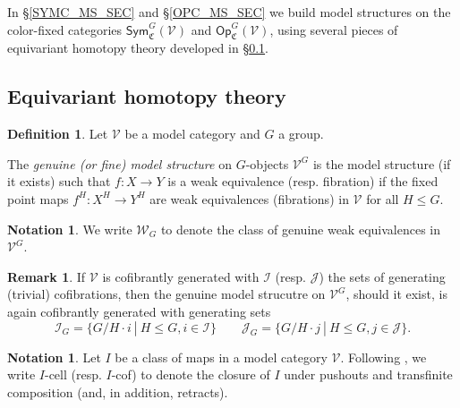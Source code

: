\documentclass[a4paper,10pt
,draft
]{article}%
\numberwithin{equation}{section}
\numberwithin{figure}{section}
\theoremstyle{definition} %
\newtheorem{definition}[equation]{Definition}%
\newtheorem{remark}[equation]{Remark}%
\newtheorem{notation}[equation]{Notation}%
\newcommand{\V}{\ensuremath{\mathcal V}}
\newcommand{\1}{\ensuremath{\mathbbm 1}}%
\begin{document}
In \S \ref{SYMC_MS_SEC} and \S \ref{OPC_MS_SEC} we build model structures on the color-fixed categories
$\mathsf{Sym}^G_{\mathfrak{C}}(\mathcal{V})$ and $\mathsf{Op}^G_{\mathfrak{C}}(\mathcal{V})$,
using several pieces of equivariant homotopy theory developed in \S \ref{EHT_SEC}.




\subsection{Equivariant homotopy theory}
\label{EHT_SEC}


\begin{definition}\label{GENMOD DEF}
Let $\V$ be a model category and $G$ a group.

The \emph{genuine (or fine) model structure} on $G$-objects $\V^G$
is the model structure (if it exists)
such that
$f\colon X \to Y$
is a weak equivalence (resp. fibration)
if the fixed point maps
$f^H\colon X^H \to Y^H$
are weak equivalences (fibrations) in $\V$
for all $H \leq G$.
\end{definition}


\begin{notation}
We write $\mathcal{W}_G$
to denote the class of genuine weak equivalences in $\V^G$.
\end{notation}


\begin{remark}
If $\V$ is cofibrantly generated with 
$\mathcal{I}$ (resp. $\mathcal{J}$)
the sets of generating (trivial) cofibrations,
then the genuine model strucutre on $\V^G$,
should it exist,
is again cofibrantly generated with generating sets
\begin{equation}\label{GENGENSETEQ}
	\mathcal{I}_G = \{G/H \cdot i \ | \ H\leq G,i\in \mathcal{I}\}
\qquad
	\mathcal{J}_G = \{G/H \cdot j \ | \ H\leq G,j\in \mathcal{J}\}.
\end{equation}
\end{remark}



\begin{notation}
Let $I$ be a class of maps in a model category $\V$.
Following \cite{Hov99}, we write 
$I$-cell (resp. $I$-cof)
to denote the closure of $I$ under pushouts and transfinite composition
(and, in addition, retracts).
\end{notation}
\end{document}
